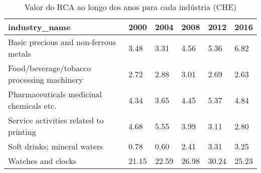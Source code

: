 \begin{table}
\centering
\caption{Valor do RCA ao longo dos anos para cada indústria (CHE)}
\begin{tabular}{p{6cm}p{1.5cm}p{1.5cm}p{1.5cm}p{1.5cm}p{1.5cm}}
\toprule
                             industry\_name &  2000 &  2004 &  2008 &  2012 &  2016 \\
\midrule
     Basic precious and non-ferrous metals &  3.48 &  3.31 &  4.56 &  5.36 &  6.82 \\
Food/beverage/tobacco processing machinery &  2.72 &  2.88 &  3.01 &  2.69 &  2.63 \\
  Pharmaceuticals medicinal chemicals etc. &  4.34 &  3.65 &  4.45 &  5.37 &  4.84 \\
    Service activities related to printing &  4.68 &  5.55 &  3.99 &  3.11 &  2.80 \\
               Soft drinks; mineral waters &  0.78 &  0.60 &  2.41 &  3.31 &  3.25 \\
                        Watches and clocks & 21.15 & 22.59 & 26.98 & 30.24 & 25.23 \\
\bottomrule
\end{tabular}
\end{table}
